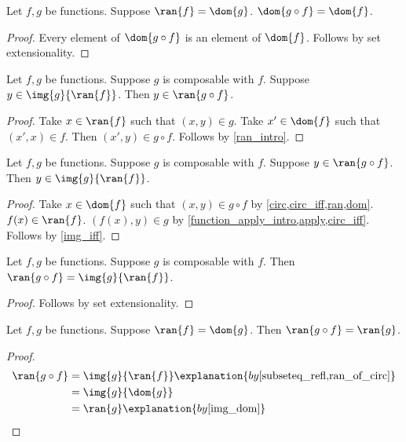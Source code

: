\begin{proposition}\label{dom_circ_exact}
    Let $f, g$ be functions.
    Suppose $\ran{f} = \dom{g}$.
    $\dom{g\circ f} = \dom{f}$.
\end{proposition}
\begin{proof}
    Every element of $\dom{g\circ f}$ is an element of $\dom{f}$.
    Follows by set extensionality.
\end{proof}

\begin{proposition}\label{ran_of_circ_intro}
    Let $f, g$ be functions.
    Suppose $g$ is composable with $f$.
    Suppose $y\in \img{g}{\ran{f}}$.
    Then $y\in \ran{g\circ f}$.
\end{proposition}
\begin{proof}
    Take $x\in\ran{f}$ such that $(x, y)\in g$.
    Take $x'\in\dom{f}$ such that $(x', x)\in f$.
    Then $(x', y) \in g\circ f$.
    Follows by \cref{ran_intro}.
\end{proof}

\begin{proposition}\label{ran_of_circ_elim}
    Let $f, g$ be functions.
    Suppose $g$ is composable with $f$.
    Suppose $y\in \ran{g\circ f}$.
    Then $y\in \img{g}{\ran{f}}$.
\end{proposition}
\begin{proof}
    Take $x\in\dom{f}$ such that $(x, y)\in g\circ f$
        by \cref{circ,circ_iff,ran,dom}.
    $f(x)\in\ran{f}$.
    $(f(x), y)\in g$
        by \cref{function_apply_intro,apply,circ_iff}.
    Follows by \cref{img_iff}.
\end{proof}

\begin{proposition}\label{ran_of_circ}
    Let $f, g$ be functions.
    Suppose $g$ is composable with $f$.
    Then $\ran{g\circ f} = \img{g}{\ran{f}}$.
\end{proposition}
\begin{proof}
    Follows by set extensionality.
\end{proof}

\begin{proposition}\label{ran_circ_exact}
    Let $f, g$ be functions.
    Suppose $\ran{f} = \dom{g}$.
    Then $\ran{g\circ f} = \ran{g}$.
\end{proposition}
\begin{proof}
    \begin{align*}
        \ran{g\circ f}
        &= \img{g}{\ran{f}}
            \explanation{by \cref{subseteq_refl,ran_of_circ}}\\
        &= \img{g}{\dom{g}}
            \\ %
        &= \ran{g}
            \explanation{by \cref{img_dom}}
    \end{align*}
\end{proof}


